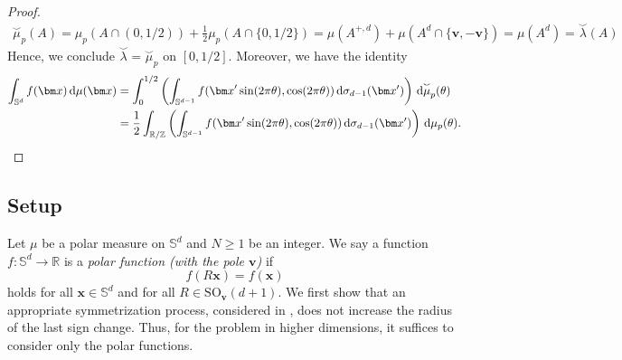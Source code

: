 \documentclass[reqno, a4paper]{amsart}
\def\R{\mathbb{R}}
\def\T{\mathbb{R}/\mathbb{Z}}
\renewcommand{\d}{\text{\rm d}}
\newcommand{\Sd}{\mathbb{S}^d}
\newcommand{\x}{{\bm x}}
\renewcommand{\v}{{\bm v}}
\newcommand{\muarc}{\overset{\smallsmile}{\mu}}
\newcommand{\lambdarc}{\overset{\smallsmile}{\lambda}}
\theoremstyle{plain}
\theoremstyle{definition}
\theoremstyle{remarkstyle}
\numberwithin{equation}{section}
\begin{document}
\begin{proof}
\begin{equation*}
\begin{split}
\muarc_p(A)=\mu_p(A\cap(0, 1/2))+\frac{1}{2}\mu_p(A\cap\{0, 1/2\})=\mu(A^{+, d})+\mu(A^d\cap\{\v, -\v\})=\mu(A^d)=\lambdarc(A)
\end{split}
\end{equation*}
Hence, we conclude $\lambdarc=\muarc_p$ on $[0, 1/2]$. Moreover, we have the identity
\begin{equation*}
\begin{split}
    \int_{\Sd} f(\x)\,\d\mu(\x)&=\int_{0}^{1/2} \left(\int_{\mathbb{S}^{d-1}} f(\x'\sin(2\pi \theta), \cos(2\pi \theta))\,\d\sigma_{d-1}(\bm x')\right)\,\d\muarc_p(\theta)\\
    &=\frac{1}{2}\int_{\T} \left(\int_{\mathbb{S}^{d-1}} f(\x'\sin(2\pi \theta), \cos(2\pi \theta))\,\d\sigma_{d-1}(\bm x')\right)\,\d\mu_p(\theta).\qedhere
\end{split}
\end{equation*}
\end{proof}

\subsection{Setup} Let $\mu$ be a polar measure on $\Sd$ and $N\geq1$ be an integer.
We say a function $f:\Sd\to \R$ is a \emph{polar function (with the pole $\v$)} if 
\begin{equation*}
    f(R\x)=f(\x)
\end{equation*}
holds for all $\x\in \Sd$ and for all $R\in \mathrm{SO}_{\v}(d+1)$. 
We first show that an appropriate symmetrization process, considered in \cite{LiTrigonometricExtremalFunctionsErdosTuran1999}, does not increase the radius of the last sign change. Thus, for the problem in higher dimensions, it suffices to consider only the polar functions. 

\medskip
\end{document}
